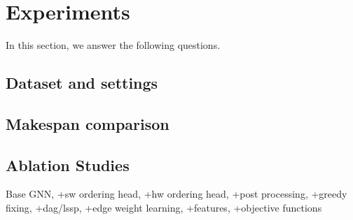 \section{Experiments}
In this section, we answer the following questions.
\subsection{Dataset and settings}

\subsection{Makespan comparison}


\subsection{Ablation Studies}
Base GNN, +sw ordering head, +hw ordering head, +post processing, +greedy fixing, +dag/lssp, +edge weight learning, +features, +objective functions 





